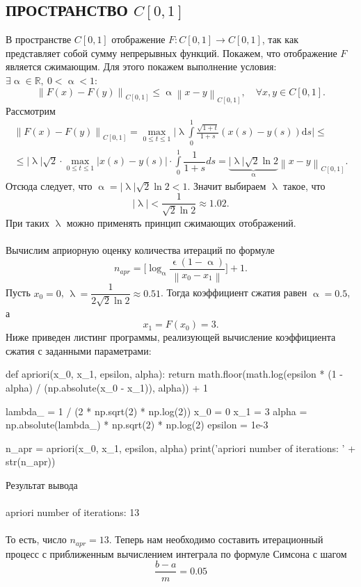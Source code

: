 \documentclass[a4paper, 12pt]{report}
\newcommand\Norm[1]{\left\| #1 \right\|}
\renewcommand{\leq}{\leqslant}
\renewcommand{\alpha}{\upalpha}
\renewcommand{\lambda}{\uplambda}
\renewcommand{\epsilon}{\upvarepsilon}
\begin{document}
		\subsection*{ПРОСТРАНСТВО $C[0,1]$}
		В пространстве $C[0,1]$ отображение $F:C[0,1] \to C[0,1]$, так как представляет собой сумму непрерывных функций. Покажем, что отображение $F$ является сжимающим. Для этого покажем выполнение условия: $\exists \alpha \in \mathbb{R},\ 0<\alpha<1:$ $$\Norm{F(x) - F(y)}_{C[0,1]} \leq \alpha\Norm{x - y}_{C[0,1]},\quad \forall x,y \in {C[0,1]}.$$
		Рассмотрим \begin{multline*}
			\Norm{F(x) - F(y)}_{C[0,1]} = \underset{0\leq t \leq 1}{\max} \Big|\lambda \int\limits_0^1 \frac{\sqrt{1 + t}}{1 + s} (x(s) - y(s))\mathrm{d} s\Big| \leq\\ \leq |\lambda| \sqrt{2} \cdot  \underset{0\leq t \leq 1}{\max} |x(s) - y(s)| \cdot\int\limits_0^1 \dfrac{1}{1 + s} ds = \underbrace{|\lambda| \sqrt{2} \ln{2}}_\alpha \Norm{x - y}_{C[0,1]}.
		\end{multline*}
		Отсюда следует, что $\alpha = |\lambda| \sqrt{2} \ln{2} < 1$. Значит выбираем $\lambda$ такое, что $$|\lambda| < \dfrac{1}{\sqrt{2} \ln{2}}\approx 1.02.$$ При таких $\lambda$ можно применять принцип сжимающих отображений. \\\\
		Вычислим априорную оценку количества итераций по формуле $$n_{apr} = \Big[\log_\alpha \dfrac{\epsilon(1-\alpha)}{\Norm{x_0 - x_1}}\Big] + 1.$$
		Пусть $x_0 = 0$, $\lambda = \dfrac{1}{2 \sqrt{2} \ln{2}}\approx 0.51$. Тогда коэффициент сжатия равен $\alpha = 0.5$, а $$x_1 = F(x_0) = 3.$$ Ниже приведен листинг программы, реализующей вычисление коэффициента сжатия с заданными параметрами:
		\begin{python}
			def apriori(x_0, x_1, epsilon, alpha):
				return math.floor(math.log(epsilon * (1 - alpha) / (np.absolute(x_0 - x_1)), alpha)) + 1
			
			lambda_ =  1 / (2 * np.sqrt(2) * np.log(2))
			x_0 = 0
			x_1 = 3
			alpha = np.absolute(lambda_) * np.sqrt(2) * np.log(2)
			epsilon = 1e-3
			
			n_apr = apriori(x_0, x_1, epsilon, alpha)
			print('apriori number of iterations: ' + str(n_apr))\end{python}
			Результат вывода\\\\
			apriori number of iterations: 13\\\\
			То есть, число $n_{apr} = 13.$
			Теперь нам необходимо составить итерационный процесс с приближенным вычислением интеграла по формуле Симсона с шагом $$\dfrac{b-a}{m} = 0.05$$
\end{document}
